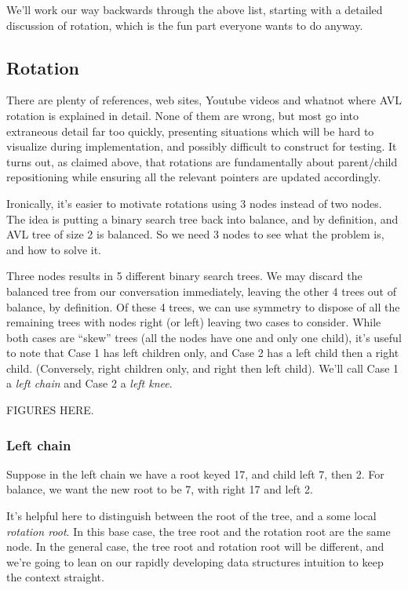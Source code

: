 \documentclass{article}
\begin{document}
We'll work our way backwards through the above list, starting with a detailed
discussion of rotation, which is the fun part everyone wants to do anyway.

\subsection{Rotation}

There are plenty of references, web sites, Youtube videos and whatnot
where AVL rotation is explained in detail. None of them are wrong, but
most go into extraneous detail far too quickly, presenting situations
which will be hard to visualize during implementation, and possibly
difficult to construct for testing. It turns out, as claimed above,
that rotations are fundamentally about parent/child repositioning
while ensuring all the relevant pointers are updated accordingly.

Ironically, it's easier to motivate rotations using 3 nodes instead
of two nodes. The idea is putting a binary search tree back into
balance, and by definition, and AVL tree of size 2 is balanced.
So we need 3 nodes to see what the problem is, and how to solve it.

Three nodes results in 5 different binary search trees. We may discard
the balanced tree from our conversation immediately, leaving the other
4 trees out of balance, by definition. Of these 4 trees, we can use
symmetry to dispose of all the remaining trees with nodes right (or left)
leaving two cases to consider. While both cases are ``skew'' trees
(all the nodes have one and only one child), it's useful to note
that Case 1 has left children only, and Case 2 has a left child then
a right child. (Conversely, right children only, and right then
left child). We'll call Case 1 a \textit{left chain} and Case 2 a
\textit{left knee}.

FIGURES HERE.

\subsubsection{Left chain}

Suppose in the left chain we have a root keyed 17, and child left
7, then 2. For balance, we want the new root to be 7, with right 17
and left 2.

It's helpful here to distinguish between the root of the tree, and a
some local \textit{rotation root}. In this base case, the tree root
and the rotation root are the same node. In the general case, the
tree root and rotation root will be different, and we're going to
lean on our rapidly developing data structures intuition to keep the
context straight.
\end{document}
